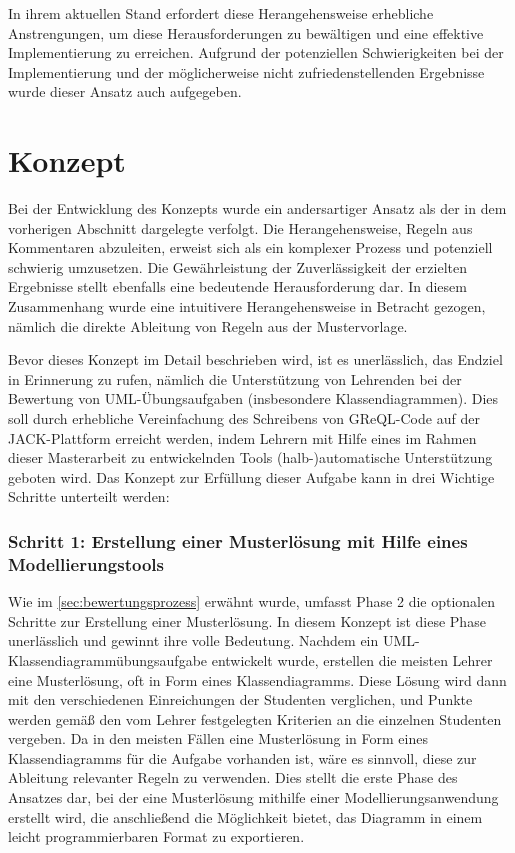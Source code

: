In ihrem aktuellen Stand erfordert diese Herangehensweise erhebliche Anstrengungen, um diese Herausforderungen zu bewältigen und eine effektive Implementierung zu erreichen. Aufgrund der potenziellen Schwierigkeiten bei der Implementierung und der möglicherweise nicht zufriedenstellenden Ergebnisse wurde dieser Ansatz auch aufgegeben.

\section{Konzept}\label{sec:konzept}

Bei der Entwicklung des Konzepts wurde ein andersartiger Ansatz als der in dem vorherigen Abschnitt dargelegte verfolgt. Die Herangehensweise, Regeln aus Kommentaren abzuleiten, erweist sich als ein komplexer Prozess und potenziell schwierig umzusetzen. Die Gewährleistung der Zuverlässigkeit der erzielten Ergebnisse stellt ebenfalls eine bedeutende Herausforderung dar. In diesem Zusammenhang wurde eine intuitivere Herangehensweise in Betracht gezogen, nämlich die direkte Ableitung von Regeln aus der Mustervorlage.

Bevor dieses Konzept im Detail beschrieben wird, ist es unerlässlich, das Endziel in Erinnerung zu rufen, nämlich die Unterstützung von Lehrenden bei der Bewertung von UML-Übungsaufgaben (insbesondere Klassendiagrammen). Dies soll durch erhebliche Vereinfachung des Schreibens von GReQL-Code auf der JACK-Plattform erreicht werden, indem Lehrern mit Hilfe eines im Rahmen dieser Masterarbeit zu entwickelnden Tools (halb-)automatische Unterstützung geboten wird. Das Konzept zur Erfüllung dieser Aufgabe kann in drei Wichtige Schritte unterteilt werden:

\subsubsection{Schritt 1: Erstellung einer Musterlösung mit Hilfe eines Modellierungstools}

Wie im \autoref{sec:bewertungsprozess} erwähnt wurde, umfasst Phase 2 die optionalen Schritte zur Erstellung einer Musterlösung. In diesem Konzept ist diese Phase unerlässlich und gewinnt ihre volle Bedeutung. Nachdem ein UML-Klassendiagrammübungsaufgabe entwickelt wurde, erstellen die meisten Lehrer eine Musterlösung, oft in Form eines Klassendiagramms. Diese Lösung wird dann mit den verschiedenen Einreichungen der Studenten verglichen, und Punkte werden gemäß den vom Lehrer festgelegten Kriterien an die einzelnen Studenten vergeben. Da in den meisten Fällen eine Musterlösung in Form eines Klassendiagramms für die Aufgabe vorhanden ist, wäre es sinnvoll, diese zur Ableitung relevanter Regeln zu verwenden. Dies stellt die erste Phase des Ansatzes dar, bei der eine Musterlösung mithilfe einer Modellierungsanwendung erstellt wird, die anschließend die Möglichkeit bietet, das Diagramm in einem leicht programmierbaren Format zu exportieren.

